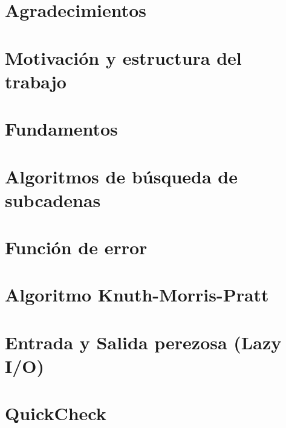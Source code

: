 \documentclass{book}
\begin{document}
\thispagestyle{empty}
\frontmatter
    
    \clearpage
    \mbox{}
    \clearpage
    \thispagestyle{empty}
    
    
    
    \chapter*{Agradecimientos}
    
    \clearpage
    
    \tableofcontents


\mainmatter
    \chapter*{Motivación y estructura del trabajo}
        
    
    \chapter{Fundamentos}
        
    
    \chapter{Algoritmos de búsqueda de subcadenas}
        

    \chapter{Función de error}
        

    \chapter{Algoritmo Knuth-Morris-Pratt}
        

    \chapter{Entrada y Salida perezosa (Lazy I/O)}
        

    \chapter{QuickCheck}
        
\end{document}
